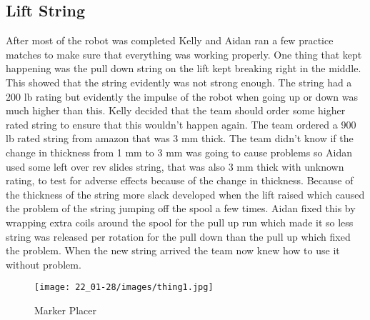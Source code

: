 \documentclass{article}
\begin{document}
\subsection{Lift String}
After most of the robot was completed Kelly and Aidan ran a few practice matches to make sure that everything was working properly. One thing that kept happening was the pull down string on the lift kept breaking right in the middle. This showed that the string evidently was not strong enough. The string had a 200 lb rating but evidently the impulse of the robot when going up or down was much higher than this. Kelly decided that the team should order some higher rated string to ensure that this wouldn't happen again. The team ordered a 900 lb rated string from amazon that was 3 mm thick. The team didn't know if the change in thickness from 1 mm  to 3 mm was going to cause problems so Aidan used some left over rev slides string, that was also 3 mm thick with unknown rating, to test for adverse effects because of the change in thickness. Because of the thickness of the string more slack developed when the lift raised which caused the problem of the string jumping off the spool a few times. Aidan fixed this by wrapping extra coils around the spool for the pull up run which made it so less string was released per rotation for the pull down than the pull up which fixed the problem. When the new string arrived the team now knew how to use it without problem.

\begin{figure}
    \centering
    \texttt{[image: 22\_01-28/images/thing1.jpg]}
    \caption{Marker Placer}
    \label{fig:markerplacer}
\end{figure}
\end{document}
